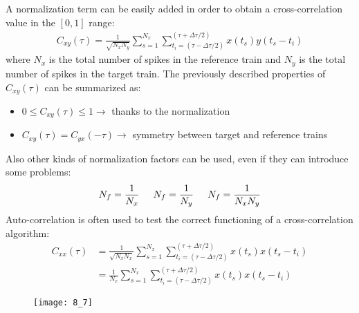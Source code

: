 A normalization term can be easily added in order to obtain
a cross-correlation value in the \([0, 1]\) range:
\begin{align*}
    C_{xy}(\tau)
    =\frac{1}{\sqrt{N_xN_y}}\sum_{s=1}^{N_x}\sum_{t_{i}=(\tau-\Delta{\tau}/2)}^{(\tau+\Delta{\tau}/2)}x(t_s)y(t_s-t_i)
\end{align*}
where \(N_x\) is the total number of spikes in the reference train and \(N_y\) is the
total number of spikes in the target train. The previously described properties of
\(C_{xy}(\tau)\) can be summarized as:
\begin{itemize}
    \item \(0\le{C_{xy}(\tau)}\le{1}\rightarrow\) thanks to the normalization
    \item \(C_{xy}(\tau)=C_{yx}(-\tau)\rightarrow\) symmetry between target and reference trains
\end{itemize}
Also other kinds of normalization factors can be used, even if they can introduce some problems:
\begin{equation*}
    N_f = \frac{1}{N_x} \hspace{0.5cm} N_f=\frac{1}{N_y} \hspace{0.5cm} N_f=\frac{1}{N_xN_y}
\end{equation*}
Auto-correlation is often used to test the correct functioning of a cross-correlation
algorithm:
\begin{align*}
    C_{xx}(\tau)
     & =\frac{1}{\sqrt{N_xN_x}}\sum_{s=1}^{N_x}\sum_{t_{i}=(\tau-\Delta{\tau}/2)}^{(\tau+\Delta{\tau}/2)}x(t_s)x(t_s-t_i) \\
     & =\frac{1}{N_x}\sum_{s=1}^{N_x}\sum_{t_{i}=(\tau-\Delta{\tau}/2)}^{(\tau+\Delta{\tau}/2)}x(t_s)x(t_s-t_i)
\end{align*}
\begin{figure}[H]
    \texttt{[image: 8\_7]}
    \centering
\end{figure}
